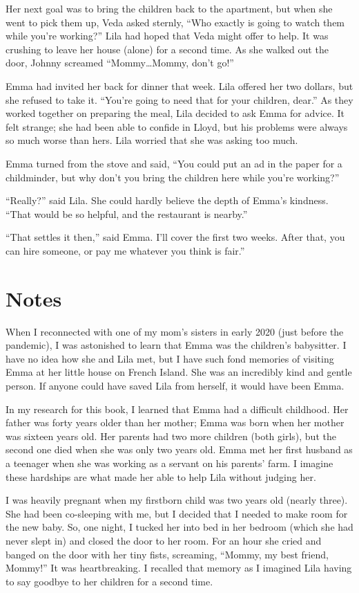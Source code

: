 \documentclass[
  letterpaper,
]{book}
\begin{document}
Her next goal was to bring the children back to the apartment, but when
she went to pick them up, Veda asked sternly, ``Who exactly is going to
watch them while you're working?'' Lila had hoped that Veda might offer
to help. It was crushing to leave her house (alone) for a second time.
As she walked out the door, Johnny screamed ``Mommy\ldots Mommy, don't
go!''

Emma had invited her back for dinner that week. Lila offered her two
dollars, but she refused to take it. ``You're going to need that for
your children, dear.'' As they worked together on preparing the meal,
Lila decided to ask Emma for advice. It felt strange; she had been able
to confide in Lloyd, but his problems were always so much worse than
hers. Lila worried that she was asking too much.

Emma turned from the stove and said, ``You could put an ad in the paper
for a childminder, but why don't you bring the children here while
you're working?''

``Really?'' said Lila. She could hardly believe the depth of Emma's
kindness. ``That would be so helpful, and the restaurant is nearby.''

``That settles it then,'' said Emma. I'll cover the first two weeks.
After that, you can hire someone, or pay me whatever you think is
fair.''

\section{Notes}\label{notes-46}

When I reconnected with one of my mom's sisters in early 2020 (just
before the pandemic), I was astonished to learn that Emma was the
children's babysitter. I have no idea how she and Lila met, but I have
such fond memories of visiting Emma at her little house on French
Island. She was an incredibly kind and gentle person. If anyone could
have saved Lila from herself, it would have been Emma.

In my research for this book, I learned that Emma had a difficult
childhood. Her father was forty years older than her mother; Emma was
born when her mother was sixteen years old. Her parents had two more
children (both girls), but the second one died when she was only two
years old. Emma met her first husband as a teenager when she was working
as a servant on his parents' farm. I imagine these hardships are what
made her able to help Lila without judging her.

I was heavily pregnant when my firstborn child was two years old (nearly
three). She had been co-sleeping with me, but I decided that I needed to
make room for the new baby. So, one night, I tucked her into bed in her
bedroom (which she had never slept in) and closed the door to her room.
For an hour she cried and banged on the door with her tiny fists,
screaming, ``Mommy, my best friend, Mommy!'' It was heartbreaking. I
recalled that memory as I imagined Lila having to say goodbye to her
children for a second time.
\end{document}
